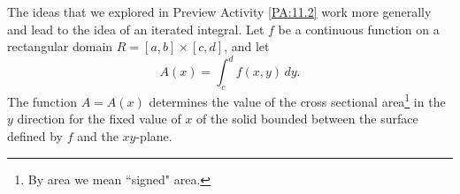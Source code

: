 The ideas that we explored in Preview Activity \ref{PA:11.2} work more generally and lead to the idea of an iterated integral. Let $f$ be a continuous function on a rectangular domain $R = [a,b] \times [c,d]$, and let
\[A(x) = \int_c^d f(x,y) \, dy.\]
The function $A = A(x)$ determines the value of the cross sectional area\footnote{By area we mean ``signed" area.} in the $y$ direction for the fixed value of $x$ of the solid bounded between the surface defined by $f$ and the $xy$-plane.

\begin{figure}[ht]
\begin{center}
 \hspace{0.25in}  \hspace{0.25in} 
\end{center}
\end{figure}
